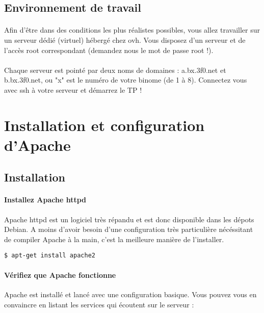 \documentclass[12pt,a4paper]{article}
\begin{document}
\subsection*{Environnement de travail}
\paragraph{}
Afin d'être dans des conditions les plus réalistes possibles, vous allez travailler sur un serveur dédié (virtuel) hébergé chez ovh. Vous disposez d'un serveur et de l'accès root correspondant (demandez nous le mot de passe root !).

\paragraph{}
Chaque serveur est pointé par deux noms de domaines : a.bx.3f0.net et b.bx.3f0.net, ou "x" est le numéro de votre binome (de 1 à 8). Connectez vous avec ssh à votre serveur et démarrez le TP !

\section{Installation et configuration d'Apache}
\subsection{Installation}

\paragraph{Installez Apache httpd\\}
Apache httpd est un logiciel très répandu et est donc disponible dans les dépots Debian. A moins d'avoir besoin d'une configuration très particulière nécéssitant de compiler Apache à la main, c'est la meilleure manière de l'installer.

\begin{lstlisting}
$ apt-get install apache2
\end{lstlisting}

\paragraph{Vérifiez que Apache fonctionne\\}
Apache est installé et lancé avec une configuration basique. Vous pouvez vous en convaincre en listant les services qui écoutent sur le serveur : 
\end{document}
